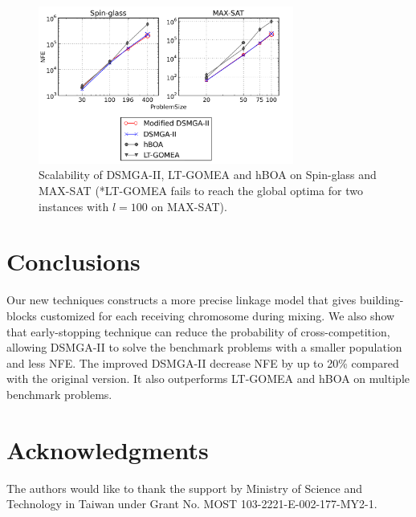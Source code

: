 \documentclass{sig-alternate-05-2015}
\begin{document}
\begin{figure}
\centering
\includegraphics[width=3.3in]{spin_satResults}
\caption{Scalability of DSMGA-II, LT-GOMEA and hBOA on Spin-glass and MAX-SAT (*LT-GOMEA fails to reach the global optima for two instances with $l=100$ on MAX-SAT).}
\end{figure}




\section{Conclusions}
Our new techniques constructs a more precise linkage model that gives building-blocks customized for each receiving chromosome during mixing. We also show that early-stopping technique can reduce the probability of cross-competition, allowing DSMGA-II to solve the benchmark problems with a smaller population and less NFE. The improved DSMGA-II decrease NFE by up to 20\% compared with the original version. It also outperforms LT-GOMEA and hBOA on multiple benchmark problems. 

\section{Acknowledgments}
The authors would like to thank the support by Ministry of Science and Technology in Taiwan under Grant No. MOST 103-2221-E-002-177-MY2-1.

%

%
%
\end{document}

